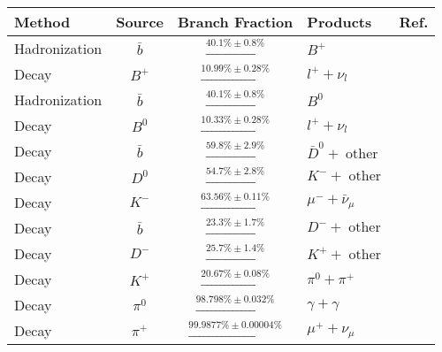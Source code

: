 \documentclass{article}
\DeclareMathOperator{\other}{\text{other}}
\begin{document}
\begin{table}
\centering
\begin{tabular}{lcclr}
  Method        & Source    & Branch Fraction                         & Products                  & Ref.     \\
  \hline
  Hadronization & $\bar{b}$ & $\xrightarrow{40.1   \% \pm 0.8    \%}$ & $B^+$                     &  \\
  Decay         & $B^+$     & $\xrightarrow{10.99  \% \pm 0.28   \%}$ & $l^+ + \nu_l$             &  \\
  \hline
  Hadronization & $\bar{b}$ & $\xrightarrow{40.1   \% \pm 0.8    \%}$ & $B^0$                     &  \\
  Decay         & $B^0$     & $\xrightarrow{10.33  \% \pm 0.28   \%}$ & $l^+ + \nu_l$             &  \\
  \hline
  Decay         & $\bar{b}$ & $\xrightarrow{59.8   \% \pm 2.9    \%}$ & $\bar{D}^{0} + \other$    &  \\
  Decay         & $D^0$     & $\xrightarrow{54.7   \% \pm 2.8    \%}$ & $K^-   + \other$          &  \\
  Decay         & $K^-$     & $\xrightarrow{63.56  \% \pm 0.11   \%}$ & $\mu^- + \bar{\nu}_{\mu}$ &  \\
  \hline
  Decay         & $\bar{b}$ & $\xrightarrow{23.3   \% \pm 1.7    \%}$ & $D^-   + \other$          &  \\
  Decay         & $D^-$     & $\xrightarrow{25.7   \% \pm 1.4    \%}$ & $K^+   + \other$          &  \\
  Decay         & $K^+$     & $\xrightarrow{20.67  \% \pm 0.08   \%}$ & $\pi^0 + \pi^+$           &  \\
  Decay         & $\pi^0$   & $\xrightarrow{98.798 \% \pm 0.032  \%}$ & $\gamma + \gamma$         &  \\
  Decay         & $\pi^+$   & $\xrightarrow{99.9877\% \pm 0.00004\%}$ & $\mu^+ + \nu_{\mu}$       &  \\
  

\end{tabular}
\end{table}
\end{document}
